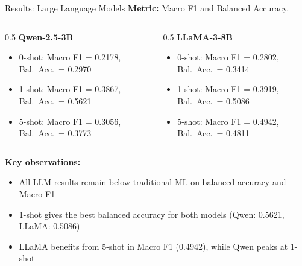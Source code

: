 \documentclass[aspectratio=169]{beamer}
\begin{document}
\begin{frame}{Results: Large Language Models}
\textbf{Metric:} Macro F1 and Balanced Accuracy.

\vspace{0.3cm}
\begin{columns}[T]
\begin{column}{0.5\textwidth}
\textbf{Qwen-2.5-3B}
\begin{itemize}
    \item 0-shot: Macro F1 = 0.2178, Bal.\ Acc.\ = 0.2970
    \item 1-shot: Macro F1 = 0.3867, Bal.\ Acc.\ = 0.5621
    \item 5-shot: Macro F1 = 0.3056, Bal.\ Acc.\ = 0.3773
\end{itemize}
\end{column}

\begin{column}{0.5\textwidth}
\textbf{LLaMA-3-8B}
\begin{itemize}
    \item 0-shot: Macro F1 = 0.2802, Bal.\ Acc.\ = 0.3414
    \item 1-shot: Macro F1 = 0.3919, Bal.\ Acc.\ = 0.5086
    \item 5-shot: Macro F1 = 0.4942, Bal.\ Acc.\ = 0.4811
\end{itemize}
\end{column}
\end{columns}

\vspace{0.4cm}
\textbf{Key observations:}
\begin{itemize}
    \item All LLM results remain below traditional ML on balanced accuracy and Macro F1
    \item 1-shot gives the best balanced accuracy for both models (Qwen: 0.5621, LLaMA: 0.5086)
    \item LLaMA benefits from 5-shot in Macro F1 (0.4942), while Qwen peaks at 1-shot
\end{itemize}
\end{frame}
\end{document}
